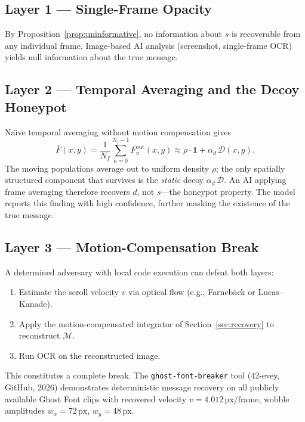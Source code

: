 \documentclass[12pt,a4paper]{article}
\begin{document}
\subsection{Layer 1 — Single-Frame Opacity}

By Proposition~\ref{prop:uninformative}, no information about $s$ is
recoverable from any individual frame.  Image-based AI analysis (screenshot,
single-frame OCR) yields null information about the true message.

\subsection{Layer 2 — Temporal Averaging and the Decoy Honeypot}

Na\"{\i}ve temporal averaging without motion compensation gives
\begin{equation}
  \bar{F}(x,y)
  = \frac{1}{N_f}\sum_{n=0}^{N_f-1} F_n^{\mathrm{out}}(x,y)
  \approx \rho \cdot \mathbf{1} + \alpha_d\,\mathcal{D}(x,y).
\end{equation}
The moving populations average out to uniform density $\rho$; the only
spatially structured component that survives is the \emph{static} decoy
$\alpha_d\,\mathcal{D}$.  An AI applying frame averaging therefore recovers
$d$, not $s$—the honeypot property.  The model reports this finding with
high confidence, further masking the existence of the true message.

\subsection{Layer 3 — Motion-Compensation Break}

A determined adversary with local code execution can defeat both layers:
\begin{enumerate}[label=\arabic*.]
  \item Estimate the scroll velocity $v$ via optical flow (e.g.,
    Farneb\"{a}ck or Lucas--Kanade).
  \item Apply the motion-compensated integrator of
    Section~\ref{sec:recovery} to reconstruct $\mathcal{M}$.
  \item Run OCR on the reconstructed image.
\end{enumerate}
This constitutes a complete break.  The \texttt{ghost-font-breaker} tool
(42-evey, GitHub, 2026) demonstrates deterministic message recovery on all
publicly available Ghost Font clips with recovered velocity
$v = 4.012\,\mathrm{px/frame}$, wobble amplitudes
$w_x = 72\,\mathrm{px}$, $w_y = 48\,\mathrm{px}$.
\end{document}
